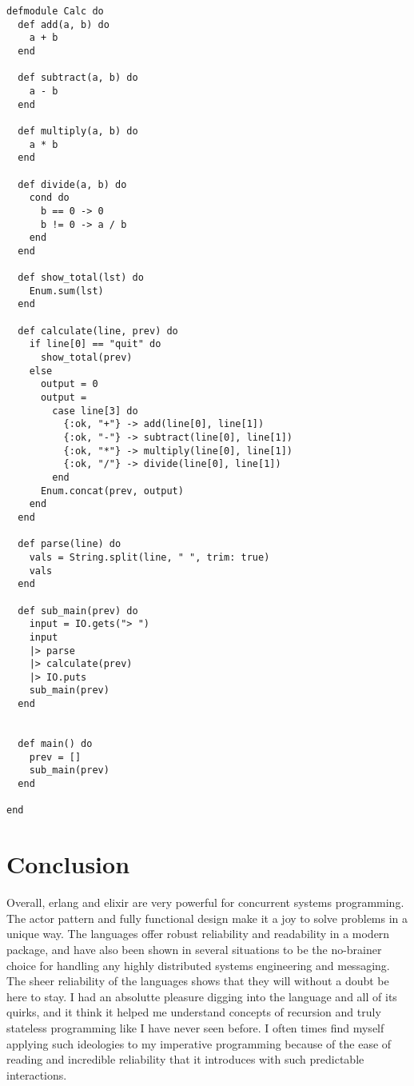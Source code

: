 \documentclass[11pt]{article}
\begin{document}
\lstset{frame=tb,language=ruby}
\begin{lstlisting}
defmodule Calc do
  def add(a, b) do
    a + b
  end

  def subtract(a, b) do
    a - b
  end

  def multiply(a, b) do
    a * b
  end

  def divide(a, b) do
    cond do
      b == 0 -> 0
      b != 0 -> a / b
    end
  end

  def show_total(lst) do
    Enum.sum(lst)
  end

  def calculate(line, prev) do
    if line[0] == "quit" do
      show_total(prev)
    else
      output = 0
      output =
        case line[3] do
          {:ok, "+"} -> add(line[0], line[1])
          {:ok, "-"} -> subtract(line[0], line[1])
          {:ok, "*"} -> multiply(line[0], line[1])
          {:ok, "/"} -> divide(line[0], line[1])
        end
      Enum.concat(prev, output)
    end
  end

  def parse(line) do
    vals = String.split(line, " ", trim: true)
    vals
  end

  def sub_main(prev) do
    input = IO.gets("> ")
    input
    |> parse
    |> calculate(prev)
    |> IO.puts
    sub_main(prev)
  end


  def main() do
    prev = []
    sub_main(prev)
  end

end
\end{lstlisting}

\section{Conclusion}
Overall, erlang and elixir are very powerful for concurrent systems programming. The actor pattern and fully functional design make it a joy to solve problems in a unique way. The languages offer robust
reliability and readability in a modern package, and have also been shown in several situations to be the no-brainer choice for handling any highly distributed systems engineering and messaging. The
sheer reliability of the languages shows that they will without a doubt be here to stay. I had an absolutte pleasure digging into the language and all of its quirks, and it think it helped me understand
concepts of recursion and truly stateless programming like I have never seen before. I often times find myself applying such ideologies to my imperative programming because of the ease of reading and
incredible reliability that it introduces with such predictable interactions.
\end{document}
